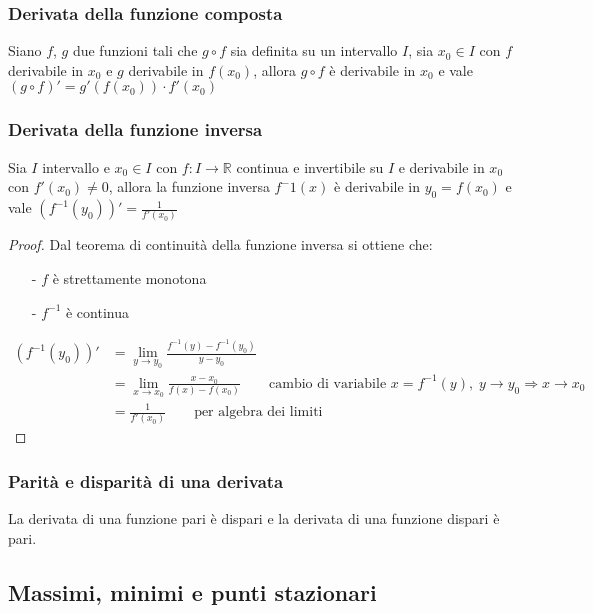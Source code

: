 \documentclass[a4paper]{article}
\begin{document}
\subsubsection*{Derivata della funzione composta}
Siano \(f\), \(g\) due funzioni tali che \(g \circ f\) sia definita su un intervallo \(I\), sia \(x_0 \in I\) con \(f\) derivabile in \(x_0\)
e \(g\) derivabile in \(f(x_0)\), allora \(g \circ f\) è derivabile in \(x_0\) e vale \(\left(g \circ f\right)' = g'(f(x_0)) \cdot f'(x_0)\)

\subsubsection*{Derivata della funzione inversa}
Sia \(I\) intervallo e \(x_0 \in I\) con \(f:I \to \mathbb{R}\) continua e invertibile su \(I\) e derivabile in \(x_0\) con \(f'(x_0) \neq 0\),
allora la funzione inversa \(f^-1(x)\) è derivabile in \(y_0 = f(x_0)\) e vale \(\displaystyle \left(f^{-1}(y_0)\right)' = \frac{1}{f'(x_0)}\)

\begin{proof}
	Dal teorema di continuità della funzione inversa si ottiene che:
	\begin{itemize} [topsep=3pt, itemsep=0pt]
		\item[-] \(f\) è strettamente monotona 
		\item[-] \(f^{-1}\) è continua
	\end{itemize}
	\begin{align*}
		\left(f^{-1}(y_0)\right)' &= \lim_{y \to y_0} \frac{f^{-1}(y) - f^{-1}(y_0)}{y - y_0} \\
		&= \lim_{x \to x_0} \frac{x - x_0}{f(x) - f(x_0)} \qquad \text{cambio di variabile } x = f^{-1}(y), \; y \to y_0 \Rightarrow x \to x_0 \\
		&= \frac{1}{f'(x_0)} \qquad \text{per algebra dei limiti}
	\end{align*}
\end{proof}

\subsubsection*{Parità e disparità di una derivata}
La derivata di una funzione pari è dispari e la derivata di una funzione dispari è pari.

\subsection{Massimi, minimi e punti stazionari}
\end{document}
